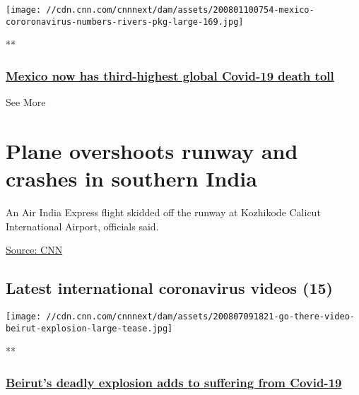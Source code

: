 \href{/videos/world/2020/08/01/mexico-coronavirus-death-toll-rivers-pkg-vpx.cnn/video/playlists/around-the-world/}{}

\texttt{[image: //cdn.cnn.com/cnnnext/dam/assets/200801100754-mexico-cororonavirus-numbers-rivers-pkg-large-169.jpg]}

**

\hypertarget{mexico-now-has-third-highest-global-covid-19-death-toll}{%
\subsubsection{\texorpdfstring{\href{/videos/world/2020/08/01/mexico-coronavirus-death-toll-rivers-pkg-vpx.cnn/video/playlists/around-the-world/}{Mexico
now has third-highest global Covid-19 death
toll}}{Mexico now has third-highest global Covid-19 death toll}}\label{mexico-now-has-third-highest-global-covid-19-death-toll}}

See More

\hypertarget{plane-overshoots-runway-and-crashes-in-southern-india-2}{%
\section{Plane overshoots runway and crashes in southern
India}\label{plane-overshoots-runway-and-crashes-in-southern-india-2}}

An Air India Express flight skidded off the runway at Kozhikode Calicut
International Airport, officials said.

\href{}{Source: CNN}

\hypertarget{latest-international-coronavirus-videos-15}{%
\subsection{Latest international coronavirus videos
(15)}\label{latest-international-coronavirus-videos-15}}

\href{/videos/world/2020/08/07/beirut-explosion-amplifies-coronavirus-economic-struggles-go-there.cnn/video/playlists/coronavirus-intl/}{}

\texttt{[image: //cdn.cnn.com/cnnnext/dam/assets/200807091821-go-there-video-beirut-explosion-large-tease.jpg]}

**

\hypertarget{beiruts-deadly-explosion-adds-to-suffering-from-covid-19}{%
\subsubsection{\texorpdfstring{\href{/videos/world/2020/08/07/beirut-explosion-amplifies-coronavirus-economic-struggles-go-there.cnn/video/playlists/coronavirus-intl/}{Beirut's
deadly explosion adds to suffering from
Covid-19}}{Beirut's deadly explosion adds to suffering from Covid-19}}\label{beiruts-deadly-explosion-adds-to-suffering-from-covid-19}}

